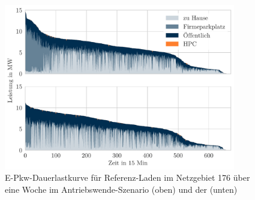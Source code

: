 \begin{figure}[H]
    \centering
    \includegraphics[width=0.9\textwidth]{Bilder/example_load_duration_curve}
    \caption{E-Pkw-Dauerlastkurve für Referenz-Laden im Netzgebiet \num{176} über eine Woche im Antriebswende-Szenario (oben) und der \SzeFirmenparkplatz (unten)}\label{fig:example_load_curve}
\end{figure}